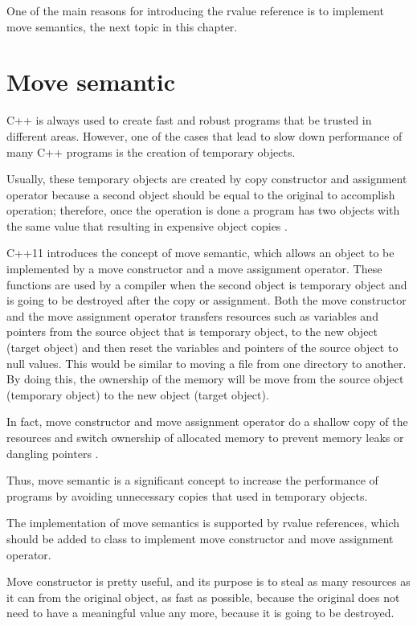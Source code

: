 \documentclass[11pt]{report}
\begin{document}
One of the main reasons for introducing the rvalue reference is to implement move semantics, the next topic in this chapter.

\section{Move semantic}
\label{section: Move semantic}
C++ is always used to create fast and robust programs that be trusted in different areas.  However, one of the cases that lead to slow down performance of many C++ programs is the creation of temporary objects.


Usually, these temporary objects are created by copy constructor and assignment operator because a second object should be equal to the original to accomplish operation; therefore, once the operation is done a program has two objects with the same value that resulting in expensive object copies \cite{Stroustrup:2005:Cpp}.


C++11 introduces the concept of move semantic, which allows an object to be implemented by a move constructor and a move assignment operator. These functions are used by a compiler when the second object is temporary object and is going to be destroyed after the copy or assignment. Both the move constructor and the move assignment operator transfers resources such as variables and pointers from the source object that is temporary object, to the new object (target object) and then reset the variables and pointers of the source object to null values. This would be similar to moving a file from one directory to another. By doing this, the ownership of the memory will be move from the source object (temporary object) to the new object (target object).


In fact, move constructor and move assignment operator do a shallow copy of the resources and switch ownership of allocated memory to prevent memory leaks or dangling pointers \cite{Gregorie:professionalcpp}.


Thus, move semantic is a significant concept to increase the performance of programs by avoiding unnecessary copies that used in temporary objects.


The implementation of move semantics is supported by rvalue references, which should be added to class to implement move constructor and move assignment operator.


Move constructor is pretty useful, and its purpose is to steal as many resources as it can from the original object, as fast as possible, because the original does not need to have a meaningful value any more, because it is going to be destroyed. 
\end{document}
